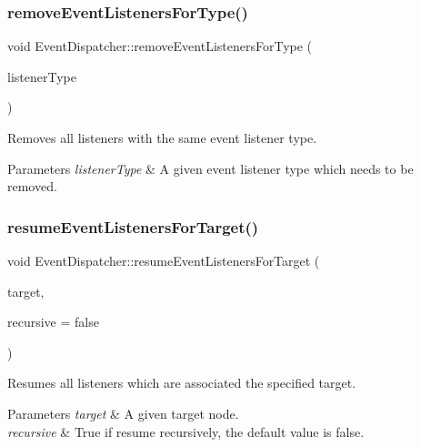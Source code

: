 \subsubsection{\texorpdfstring{remove\+Event\+Listeners\+For\+Type()}{removeEventListenersForType()}\hspace{0.1cm}{\footnotesize\ttfamily [2/2]}}
{\footnotesize\ttfamily void Event\+Dispatcher\+::remove\+Event\+Listeners\+For\+Type (\begin{DoxyParamCaption}\item[{\hyperlink{classEventListener_ab78e6acdfa2343490eda9e92d1555ee4}{Event\+Listener\+::\+Type}}]{listener\+Type }\end{DoxyParamCaption})}

Removes all listeners with the same event listener type.


\begin{DoxyParams}{Parameters}
{\em listener\+Type} & A given event listener type which needs to be removed. \\
\hline
\end{DoxyParams}
\mbox{\label{classEventDispatcher_af38aed6f3a7890dc03f214dbaf49faf6}} 
\subsubsection{\texorpdfstring{resume\+Event\+Listeners\+For\+Target()}{resumeEventListenersForTarget()}\hspace{0.1cm}{\footnotesize\ttfamily [1/2]}}
{\footnotesize\ttfamily void Event\+Dispatcher\+::resume\+Event\+Listeners\+For\+Target (\begin{DoxyParamCaption}\item[{\hyperlink{classNode}{Node} $\ast$}]{target,  }\item[{bool}]{recursive = {\ttfamily false} }\end{DoxyParamCaption})}

Resumes all listeners which are associated the specified target.


\begin{DoxyParams}{Parameters}
{\em target} & A given target node. \\
\hline
{\em recursive} & True if resume recursively, the default value is false. \\
\hline
\end{DoxyParams}
\mbox{\label{classEventDispatcher_af38aed6f3a7890dc03f214dbaf49faf6}} 
